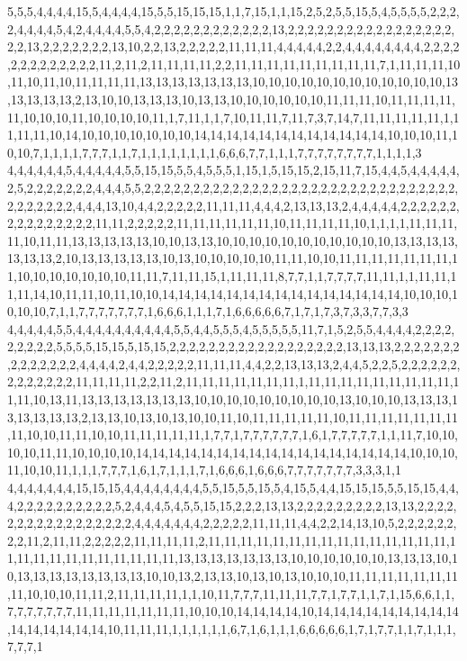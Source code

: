 5,5,5,4,4,4,4,15,5,4,4,4,4,15,5,5,15,15,15,1,1,7,15,1,1,15,2,5,2,5,5,15,5,4,5,5,5,5,2,2,2,2,4,4,4,4,5,4,2,4,4,4,4,5,5,4,2,2,2,2,2,2,2,2,2,2,2,2,13,2,2,2,2,2,2,2,2,2,2,2,2,2,2,2,2,2,2,2,13,2,2,2,2,2,2,2,13,10,2,2,13,2,2,2,2,2,11,11,11,4,4,4,4,4,2,2,4,4,4,4,4,4,4,4,2,2,2,2,2,2,2,2,2,2,2,2,2,11,2,11,2,11,11,11,11,2,2,11,11,11,11,11,11,11,11,11,7,1,11,11,11,10,11,10,11,10,11,11,11,11,13,13,13,13,13,13,13,10,10,10,10,10,10,10,10,10,10,10,10,13,13,13,13,13,2,13,10,10,13,13,13,10,13,13,10,10,10,10,10,10,11,11,11,10,11,11,11,11,11,10,10,10,11,10,10,10,10,11,1,7,11,1,1,7,10,11,11,7,11,7,3,7,14,7,11,11,11,11,11,1,11,11,11,10,14,10,10,10,10,10,10,10,14,14,14,14,14,14,14,14,14,14,14,14,10,10,10,11,10,10,7,1,1,1,1,7,7,7,1,1,7,1,1,1,1,1,1,1,1,6,6,6,7,7,1,1,1,7,7,7,7,7,7,7,7,1,1,1,1,3
4,4,4,4,4,4,5,4,4,4,4,4,5,5,15,15,5,5,4,5,5,5,1,15,1,5,15,15,2,15,11,7,15,4,4,5,4,4,4,4,4,2,5,2,2,2,2,2,2,2,4,4,4,5,5,2,2,2,2,2,2,2,2,2,2,2,2,2,2,2,2,2,2,2,2,2,2,2,2,2,2,2,2,2,2,2,2,2,2,2,2,2,2,2,4,4,4,13,10,4,4,2,2,2,2,2,11,11,11,4,4,4,2,13,13,13,2,4,4,4,4,4,2,2,2,2,2,2,2,2,2,2,2,2,2,2,2,11,11,2,2,2,2,2,11,11,11,11,11,11,10,11,11,11,11,10,1,1,1,1,11,11,11,11,10,11,11,13,13,13,13,13,10,10,13,13,10,10,10,10,10,10,10,10,10,10,10,13,13,13,13,13,13,13,2,10,13,13,13,13,13,10,13,10,10,10,10,10,11,11,10,10,11,11,11,11,11,11,11,11,10,10,10,10,10,10,10,11,11,7,11,11,15,1,11,11,11,8,7,7,1,1,7,7,7,7,11,11,1,1,11,11,11,11,14,10,11,11,10,11,10,10,14,14,14,14,14,14,14,14,14,14,14,14,14,14,14,10,10,10,10,10,10,7,1,1,7,7,7,7,7,7,7,1,6,6,6,1,1,1,7,1,6,6,6,6,6,7,1,7,1,7,3,7,3,3,7,7,3,3
4,4,4,4,4,5,5,4,4,4,4,4,4,4,4,4,4,5,5,4,4,5,5,5,4,5,5,5,5,5,11,7,1,5,2,5,5,4,4,4,4,2,2,2,2,2,2,2,2,2,5,5,5,5,15,15,5,15,15,2,2,2,2,2,2,2,2,2,2,2,2,2,2,2,2,2,2,13,13,13,2,2,2,2,2,2,2,2,2,2,2,2,2,2,4,4,4,4,2,4,4,2,2,2,2,2,11,11,11,4,4,2,2,13,13,13,2,4,4,5,2,2,5,2,2,2,2,2,2,2,2,2,2,2,2,2,11,11,11,11,2,2,11,2,11,11,11,11,11,11,11,1,11,11,11,11,11,11,11,11,11,11,11,10,13,11,13,13,13,13,13,13,13,10,10,10,10,10,10,10,10,10,13,10,10,10,13,13,13,13,13,13,13,13,2,13,13,10,13,10,13,10,10,11,10,11,11,11,11,11,10,11,11,11,11,11,11,11,11,10,10,11,11,10,10,11,11,11,11,11,1,7,7,1,7,7,7,7,7,7,1,6,1,7,7,7,7,7,1,1,11,7,10,10,10,10,11,11,10,10,10,10,14,14,14,14,14,14,14,14,14,14,14,14,14,14,14,14,14,10,10,10,11,10,10,11,1,1,1,7,7,7,1,6,1,7,1,1,1,7,1,6,6,6,1,6,6,6,7,7,7,7,7,7,7,3,3,3,1,1
4,4,4,4,4,4,4,15,15,15,4,4,4,4,4,4,4,4,5,5,15,5,5,15,5,4,15,5,4,4,15,15,15,5,5,15,15,4,4,4,2,2,2,2,2,2,2,2,2,2,5,2,4,4,4,5,4,5,5,15,15,2,2,2,13,13,2,2,2,2,2,2,2,2,2,13,13,2,2,2,2,2,2,2,2,2,2,2,2,2,2,2,2,2,4,4,4,4,4,4,4,2,2,2,2,2,11,11,11,4,4,2,2,14,13,10,5,2,2,2,2,2,2,2,2,11,2,11,11,2,2,2,2,2,11,11,11,11,2,11,11,11,11,11,11,11,11,11,11,11,11,11,11,11,11,11,11,11,11,11,11,11,11,11,11,13,13,13,13,13,13,13,10,10,10,10,10,10,13,13,13,10,10,13,13,13,13,13,13,13,13,10,10,13,2,13,13,10,13,10,13,10,10,10,11,11,11,11,11,11,11,11,10,10,10,11,11,2,11,11,11,11,1,1,10,11,7,7,7,11,11,11,7,7,1,7,7,1,1,7,1,15,6,6,1,1,7,7,7,7,7,7,7,11,11,11,11,11,11,11,10,10,10,14,14,14,14,10,14,14,14,14,14,14,14,14,14,14,14,14,14,14,14,10,11,11,11,1,1,1,1,1,1,6,7,1,6,1,1,1,6,6,6,6,6,1,7,1,7,7,1,1,7,1,1,1,7,7,7,1
